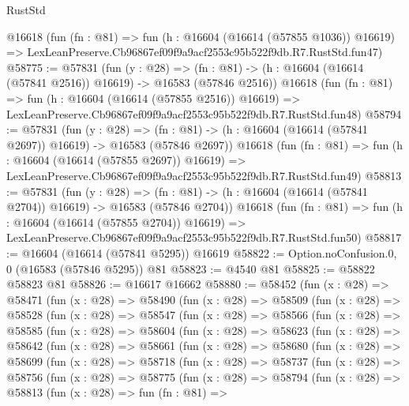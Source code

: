 \begin{lexlean}{RustStd}
\begin{coremodule}
    @16618
    (fun (fn : @81) =>
    fun (h : @16604 (@16614 (@57855 @1036)) @16619) =>
    LexLeanPreserve.Cb96867ef09f9a9acf2553c95b522f9db.R7.RustStd.fun47)
@58775 := @57831
    (fun (y : @28) =>
    (fn : @81) -> (h : @16604 (@16614 (@57841 @2516)) @16619) -> @16583 (@57846 @2516))
    @16618
    (fun (fn : @81) =>
    fun (h : @16604 (@16614 (@57855 @2516)) @16619) =>
    LexLeanPreserve.Cb96867ef09f9a9acf2553c95b522f9db.R7.RustStd.fun48)
@58794 := @57831
    (fun (y : @28) =>
    (fn : @81) -> (h : @16604 (@16614 (@57841 @2697)) @16619) -> @16583 (@57846 @2697))
    @16618
    (fun (fn : @81) =>
    fun (h : @16604 (@16614 (@57855 @2697)) @16619) =>
    LexLeanPreserve.Cb96867ef09f9a9acf2553c95b522f9db.R7.RustStd.fun49)
@58813 := @57831
    (fun (y : @28) =>
    (fn : @81) -> (h : @16604 (@16614 (@57841 @2704)) @16619) -> @16583 (@57846 @2704))
    @16618
    (fun (fn : @81) =>
    fun (h : @16604 (@16614 (@57855 @2704)) @16619) =>
    LexLeanPreserve.Cb96867ef09f9a9acf2553c95b522f9db.R7.RustStd.fun50)
@58817 := @16604 (@16614 (@57841 @5295)) @16619
@58822 := Option.noConfusion.{0, 0} (@16583 (@57846 @5295)) @81
@58823 := @4540 @81
@58825 := @58822 @58823 @81
@58826 := @16617 @16662
@58880 := @58452
    (fun (x : @28) =>
    @58471
      (fun (x : @28) =>
      @58490
        (fun (x : @28) =>
        @58509
          (fun (x : @28) =>
          @58528
            (fun (x : @28) =>
            @58547
              (fun (x : @28) =>
              @58566
                (fun (x : @28) =>
                @58585
                  (fun (x : @28) =>
                  @58604
                    (fun (x : @28) =>
                    @58623
                      (fun (x : @28) =>
                      @58642
                        (fun (x : @28) =>
                        @58661
                          (fun (x : @28) =>
                          @58680
                            (fun (x : @28) =>
                            @58699
                              (fun (x : @28) =>
                              @58718
                                (fun (x : @28) =>
                                @58737
                                  (fun (x : @28) =>
                                  @58756
                                    (fun (x : @28) =>
                                    @58775
                                      (fun (x : @28) =>
                                      @58794
                                        (fun (x : @28) =>
                                        @58813
                                          (fun (x : @28) =>
                                          fun (fn : @81) =>

\end{coremodule}
\end{lexlean}
